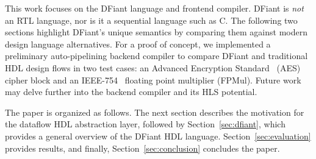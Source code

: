 This work focuses on the DFiant language and frontend compiler. DFiant is \emph{not} an RTL language, nor is it a sequential language such as C. The following two sections highlight DFiant's unique semantics by comparing them against modern design language alternatives. For a proof of concept, we implemented a preliminary auto-pipelining backend compiler to compare DFiant and traditional HDL design flows in two test cases: an Advanced Encryption Standard~\cite{pub2001197} (AES) cipher block and an IEEE-754~\cite{IEEE2008} floating point multiplier (FPMul). Future work may delve further into the backend compiler and its HLS potential.


The paper is organized as follows. The next section describes the motivation for the dataflow HDL abstraction layer, followed by Section~\ref{sec:dfiant}, which provides a general overview of the DFiant HDL language. 
Section~\ref{sec:evaluation} provides results, and finally, Section~\ref{sec:conclusion} concludes the paper.




 





